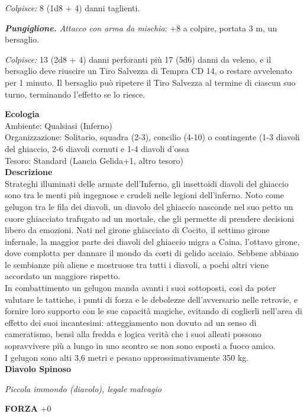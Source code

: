 \begin{multicols}{2}
\emph{Colpisce:} 8 (1d8 + 4) danni taglienti.

\emph{\textbf{Pungiglione.} Attacco con arma da mischia}: +8 a colpire, portata 3 m, un bersaglio.

\emph{Colpisce:} 13 (2d8 + 4) danni perforanti più 17 (5d6) danni da veleno, e il bersaglio deve riuscire un Tiro Salvezza di Tempra CD 14, o restare avvelenato per 1 minuto. Il bersaglio può ripetere il Tiro Salvezza al termine di ciascun suo turno, terminando l'effetto se lo riesce.

\textbf{Ecologia}\\
Ambiente: Qualsiasi (Inferno)\\
Organizzazione: Solitario, squadra (2-3), concilio (4-10) o contingente (1-3 diavoli del ghiaccio, 2-6 diavoli cornuti e 1-4 diavoli d'ossa\\
Tesoro: Standard (Lancia Gelida+1, altro tesoro)\\
\textbf{Descrizione}\\
Strateghi illuminati delle armate dell'Inferno, gli insettoidi diavoli del ghiaccio sono tra le menti più ingegnose e crudeli nelle legioni dell'inferno. Noto come gelugon tra le fila dei diavoli, un diavolo del ghiaccio nasconde nel suo petto un cuore ghiacciato trafugato ad un mortale, che gli permette di prendere decisioni libero da emozioni. Nati nel girone ghiacciato di Cocito, il settimo girone infernale, la maggior parte dei diavoli del ghiaccio migra a Caina, l'ottavo girone, dove complotta per dannare il mondo da corti di gelido acciaio. Sebbene abbiano le sembianze più aliene e mostruose tra tutti i diavoli, a pochi altri viene accordato un maggiore rispetto.\\
In combattimento un gelugon manda avanti i suoi sottoposti, così da poter valutare le tattiche, i punti di forza e le debolezze dell'avversario nelle retrovie, e fornire loro supporto con le sue capacità magiche, evitando di coglierli nell'area di effetto dei suoi incantesimi: atteggiamento non dovuto ad un senso di cameratismo, bensì alla fredda e logica verità che i suoi alleati possono sopravvivere più a lungo in uno scontro se non sono esposti a fuoco amico.\\
I gelugon sono alti 3,6 metri e pesano approssimativamente 350 kg.\\


\medskip{}\textbf{Diavolo Spinoso}

\emph{Piccola immondo (diavolo), legale malvagio}

\textbf{FORZA} +0


\end{multicols}

